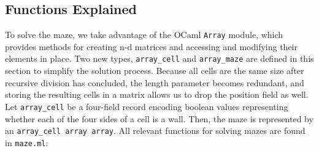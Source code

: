 \documentclass[11pt, margin=1in]{article}
\begin{document}
\subsection{Functions Explained} %
To solve the maze, we take advantage of the OCaml \texttt{Array} module, which provides methods for creating n-d matrices and accessing and modifying their elements in place. Two new types, \texttt{array\_cell} and \texttt{array\_maze} are defined in this section to simplify the solution process. Because all cells are the same size after recursive division has concluded, the length parameter becomes redundant, and storing the resulting cells in a matrix allows us to drop the position field as well. Let \texttt{array\_cell} be a four-field record encoding boolean values representing whether each of the four sides of a cell is a wall. Then, the maze is represented by an \texttt{array\_cell array array}. All relevant functions for solving mazes are found in \texttt{maze.ml}:
\end{document}
